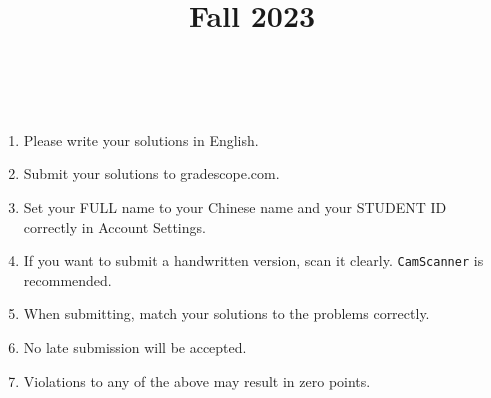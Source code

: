 \documentclass[11pt, addpoints, answers]{exam}
\title{
	\CourseName\\
	Fall 2023\\
	\HomeworkNO\\
}
\author{}
\date{\DueDate}
\newcommand{\ttt}{\texttt}
\begin{document}
\maketitle

\begin{enumerate}
	\item Please write your solutions in English.
	\item Submit your solutions to gradescope.com.
	\item Set your FULL name to your Chinese name and your STUDENT ID correctly in Account Settings.
	\item If you want to submit a handwritten version, scan it clearly. \ttt{CamScanner} is recommended.
	\item When submitting, match your solutions to the problems correctly.
	\item No late submission will be accepted.
	\item Violations to any of the above may result in zero points.
\end{enumerate}

\begin{questions}

	

	\newpage
	
	\newpage
	
    \newpage
    
    \newpage
    
    \newpage
    
    
\end{questions}
\end{document}
